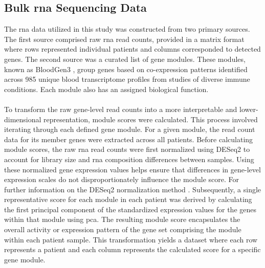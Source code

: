 \documentclass[12pt,a4paper]{report}
\begin{document}
\subsection{Bulk \acrshort{rna} Sequencing Data}
\label{subsec:rna_data_construction}
The \acrshort{rna} data utilized in this study was constructed from two primary sources. The first source comprised raw \acrshort{rna} read counts, provided in a matrix format where rows represented individual patients and columns corresponded to detected genes. The second source was a curated list of gene modules. These modules, known as BloodGen3 \cite{Altman2021BloodGen3}, group genes based on co-expression patterns identified across 985 unique blood transcriptome profiles from studies of diverse immune conditions. Each module also has an assigned biological function.\\
\\
To transform the raw gene-level read counts into a more interpretable and lower-dimensional representation, module scores were calculated. This process involved iterating through each defined gene module. For a given module, the read count data for its member genes were extracted across all patients. Before calculating module scores, the raw \acrshort{rna} read counts were first normalized using DESeq2 to account for library size and \acrshort{rna} composition differences between samples. Using these normalized gene expression values helps ensure that differences in gene-level expression scales do not disproportionately influence the module score. For further information on the DESeq2 normalization method \cite{love2014deseq2}. Subsequently, a single representative score for each module in each patient was derived by calculating the first principal component of the standardized expression values for the genes within that module using \gls{pca}. The resulting module score encapsulates the overall activity or expression pattern of the gene set comprising the module within each patient sample. This transformation yields a dataset where each row represents a patient and each column represents the calculated score for a specific gene module.
\end{document}
